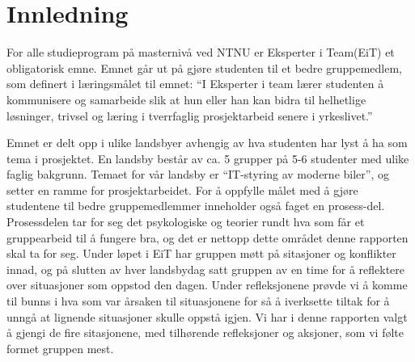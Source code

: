 \chapter{Innledning}

For alle studieprogram på masternivå ved NTNU er Eksperter i Team(EiT) et obligatorisk emne. Emnet går ut på gjøre 
studenten til et bedre gruppemedlem, som definert i læringsmålet til emnet: ``I Eksperter i team lærer studenten å 
kommunisere og samarbeide slik at hun eller han kan
bidra til helhetlige løsninger, trivsel og læring i tverrfaglig prosjektarbeid senere i yrkeslivet.'' \cite{læringsmål}

Emnet er delt opp i ulike landsbyer avhengig av hva studenten har lyst å ha som tema i prosjektet. En landsby består 
av ca. 5 grupper på 5-6 studenter med ulike faglig bakgrunn. Temaet for vår landsby er ``IT-styring av moderne 
biler'', og setter en ramme for prosjektarbeidet. \cite{tdt4856} For å oppfylle målet med å gjøre studentene til bedre gruppemedlemmer 
inneholder også faget en prosess-del. Prosessdelen tar for seg det psykologiske og teorier rundt hva som får 
et gruppearbeid til å fungere bra, og det er nettopp dette området denne rapporten skal ta for seg. 
Under løpet i EiT har gruppen møtt på sitasjoner og konflikter innad, og på slutten av 
hver landsbydag satt gruppen av en time for å reflektere over situasjoner som oppstod den dagen. Under refleksjonene 
prøvde vi å komme til bunns i hva som var årsaken til situasjonene for så å iverksette tiltak for å unngå 
at lignende situasjoner skulle oppstå igjen. Vi har i denne rapporten valgt å gjengi de fire sitasjonene, med tilhørende 
refleksjoner og aksjoner, som vi følte formet gruppen mest.


